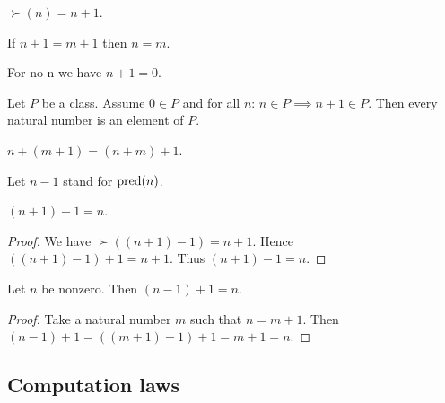 \documentclass[../../natural-numbers.ftl.tex]{subfiles}
\begin{document}
  \begin{forthel}
    \begin{lemma}
      $\succ(n) = n + 1$.
    \end{lemma}

    \begin{corollary}
      If $n + 1 = m + 1$ then $n = m$.
    \end{corollary}

    \begin{corollary}
      For no n we have $n + 1 = 0$.
    \end{corollary}

    \begin{corollary}
      Let $P$ be a class.
      Assume $0 \in P$ and for all $n$: $n \in P \implies n + 1 \in P$.
      Then every natural number is an element of $P$.
    \end{corollary}

    \begin{corollary}
      $n + (m + 1) = (n + m) + 1$.
    \end{corollary}

    Let $n - 1$ stand for $\operatorname{pred}(n)$.

    \begin{proposition}
      $(n + 1) - 1 = n$.
    \end{proposition}
    \begin{proof}
      We have $\succ((n + 1) - 1) = n + 1$.
      Hence $((n + 1) - 1) + 1 = n + 1$.
      Thus $(n + 1) - 1 = n$.
    \end{proof}

    \begin{corollary}
      Let $n$ be nonzero.
      Then $(n - 1) + 1 = n$.
    \end{corollary}
    \begin{proof}
      Take a natural number $m$ such that $n = m + 1$.
      Then $(n - 1) + 1 = ((m + 1) - 1) + 1 = m + 1 = n$.
    \end{proof}
  \end{forthel}


  \subsection{Computation laws}
\end{document}
